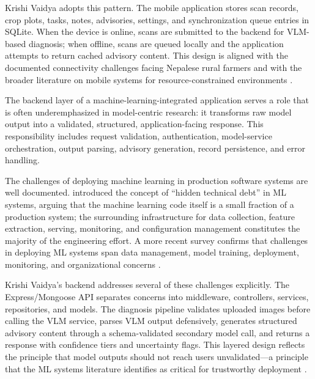 Krishi Vaidya adopts this pattern. The mobile application stores scan records, crop plots,
tasks, notes, advisories, settings, and synchronization queue entries in SQLite. When the
device is online, scans are submitted to the backend for VLM-based diagnosis; when offline,
scans are queued locally and the application attempts to return cached advisory content. This
design is aligned with the documented connectivity challenges facing Nepalese rural farmers
\parencite{khatriNepalDigitalAgri2023,faoNepalDigitalAgriculture} and with the broader
literature on mobile systems for resource-constrained environments
\parencite{silvestriSmallholderTechAdoption2021}.


The backend layer of a machine-learning-integrated application serves a role that is often
underemphasized in model-centric research: it transforms raw model output into a validated,
structured, application-facing response. This responsibility includes request validation,
authentication, model-service orchestration, output parsing, advisory generation, record
persistence, and error handling.

The challenges of deploying machine learning in production software systems are well documented.
\textcite{sculleyMLTechDebt2015} introduced the concept of ``hidden technical debt'' in ML
systems, arguing that the machine learning code itself is a small fraction of a production
system; the surrounding infrastructure for data collection, feature extraction, serving,
monitoring, and configuration management constitutes the majority of the engineering effort.
A more recent survey confirms that challenges in deploying ML systems span data management,
model training, deployment, monitoring, and organizational concerns
\parencite{paleyes2022MLSystemsChallenges}.

Krishi Vaidya's backend addresses several of these challenges explicitly. The Express/Mongoose
API separates concerns into middleware, controllers, services, repositories, and models. The
diagnosis pipeline validates uploaded images before calling the VLM service, parses VLM output
defensively, generates structured advisory content through a schema-validated secondary model
call, and returns a response with confidence tiers and uncertainty flags. This layered design
reflects the principle that model outputs should not reach users unvalidated---a principle that
the ML systems literature identifies as critical for trustworthy deployment
\parencite{paleyes2022MLSystemsChallenges}.

